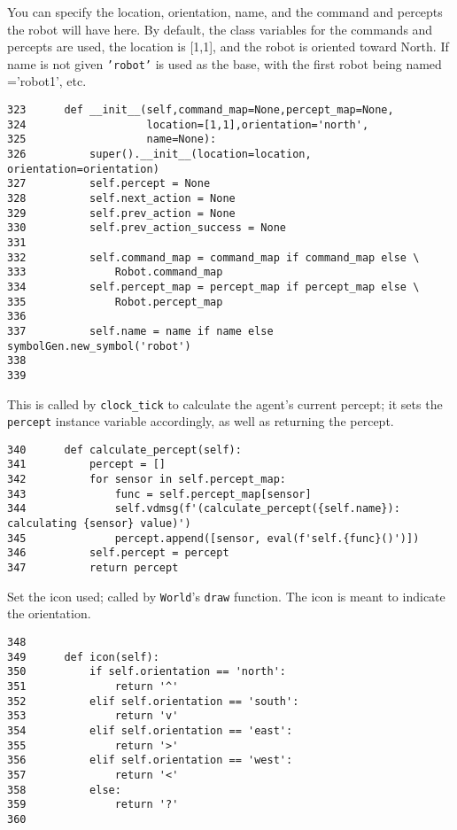 \documentclass[11pt]{tufte-handout}
\begin{document}
You can specify the location, orientation, name, and the command and percepts the robot will have here.  By default, the class variables for the commands and percepts are used, the location is [1,1], and the robot is oriented toward North.  If name is not given \texttt{'robot'} is used as the base, with the first robot being named ='robot1', etc.

\begin{verbatim}
323      def __init__(self,command_map=None,percept_map=None,
324                   location=[1,1],orientation='north',
325                   name=None):
326          super().__init__(location=location, orientation=orientation)
327          self.percept = None
328          self.next_action = None
329          self.prev_action = None
330          self.prev_action_success = None
331          
332          self.command_map = command_map if command_map else \
333              Robot.command_map
334          self.percept_map = percept_map if percept_map else \
335              Robot.percept_map
336  
337          self.name = name if name else symbolGen.new_symbol('robot')
338  
339  
\end{verbatim}

This is called by \texttt{clock\_tick} to calculate the agent's current percept; it sets the \texttt{percept} instance variable accordingly, as well as returning the percept.

\begin{verbatim}
340      def calculate_percept(self):
341          percept = []
342          for sensor in self.percept_map:
343              func = self.percept_map[sensor]
344              self.vdmsg(f'(calculate_percept({self.name}): calculating {sensor} value)')
345              percept.append([sensor, eval(f'self.{func}()')])
346          self.percept = percept
347          return percept
\end{verbatim}

Set the icon used; called by \texttt{World}'s \texttt{draw} function.  The icon is meant to indicate the orientation.

\begin{verbatim}
348  
349      def icon(self):
350          if self.orientation == 'north':
351              return '^'
352          elif self.orientation == 'south':
353              return 'v'
354          elif self.orientation == 'east':
355              return '>'
356          elif self.orientation == 'west':
357              return '<'
358          else:
359              return '?'
360          
\end{verbatim}
\end{document}
